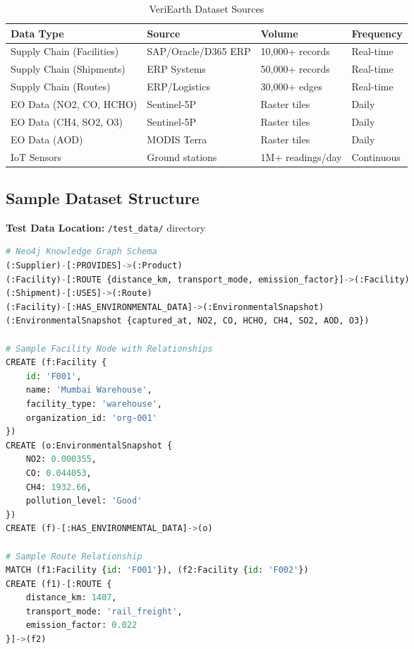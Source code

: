 \documentclass[11pt,a4paper]{article}
\begin{document}
\begin{table}[H]
\centering
\begin{tabular}{|l|l|l|l|}
\hline
\textbf{Data Type} & \textbf{Source} & \textbf{Volume} & \textbf{Frequency} \\
\hline
Supply Chain (Facilities) & SAP/Oracle/D365 ERP & 10,000+ records & Real-time \\
Supply Chain (Shipments) & ERP Systems & 50,000+ records & Real-time \\
Supply Chain (Routes) & ERP/Logistics & 30,000+ edges & Real-time \\
EO Data (NO2, CO, HCHO) & Sentinel-5P & Raster tiles & Daily \\
EO Data (CH4, SO2, O3) & Sentinel-5P & Raster tiles & Daily \\
EO Data (AOD) & MODIS Terra & Raster tiles & Daily \\
IoT Sensors & Ground stations & 1M+ readings/day & Continuous \\
\hline
\end{tabular}
\caption{VeriEarth Dataset Sources}
\end{table}

\subsection{Sample Dataset Structure}

\textbf{Test Data Location:} \texttt{/test\_data/} directory

\begin{lstlisting}[language=Python, caption=Knowledge Graph Node Types, basicstyle=\footnotesize]
# Neo4j Knowledge Graph Schema
(:Supplier)-[:PROVIDES]->(:Product)
(:Facility)-[:ROUTE {distance_km, transport_mode, emission_factor}]->(:Facility)
(:Shipment)-[:USES]->(:Route)
(:Facility)-[:HAS_ENVIRONMENTAL_DATA]->(:EnvironmentalSnapshot)
(:EnvironmentalSnapshot {captured_at, NO2, CO, HCHO, CH4, SO2, AOD, O3})

# Sample Facility Node with Relationships
CREATE (f:Facility {
    id: 'F001',
    name: 'Mumbai Warehouse',
    facility_type: 'warehouse',
    organization_id: 'org-001'
})
CREATE (o:EnvironmentalSnapshot {
    NO2: 0.000355,
    CO: 0.044053,
    CH4: 1932.66,
    pollution_level: 'Good'
})
CREATE (f)-[:HAS_ENVIRONMENTAL_DATA]->(o)

# Sample Route Relationship
MATCH (f1:Facility {id: 'F001'}), (f2:Facility {id: 'F002'})
CREATE (f1)-[:ROUTE {
    distance_km: 1407,
    transport_mode: 'rail_freight',
    emission_factor: 0.022
}]->(f2)
\end{lstlisting}
\end{document}
